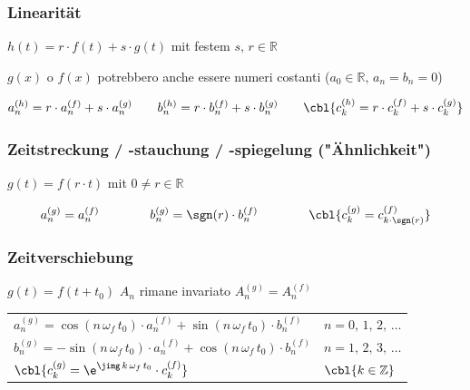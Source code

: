 \subsubsection{Linearität}
\begin{center}
\end{center}

$h(t) = r \cdot f(t) + s \cdot g(t)$ mit festem $s, \, r \in \mathbb{R}$

$g(x)$ o $f(x)$ potrebbero anche essere numeri costanti ($a_0 \in \mathbb{R}, \, a_n = b_n = 0$)

$$ a_n^{(h)} = r \cdot a_n^{(f)} + s \cdot a_n^{(g)} \qquad b_n^{(h)} = r \cdot b_n^{(f)} + s \cdot b_n^{(g)} \qquad \cbl{c_k^{(h)} = r \cdot c_k^{(f)} + s \cdot c_k^{(g)}}$$

\subsubsection{Zeitstreckung / -stauchung / -spiegelung ("Ähnlichkeit")}

$g(t) = f(r \cdot t)$ mit $0 \neq r \in \mathbb{R}$ \qquad {}

\[ a_n^{(g)} = a_n^{(f)} \qquad \qquad b_n^{(g)} = \sgn(r) \cdot b_n^{(f)} 
\qquad \qquad \cbl{c_k^{(g)} = c_{k\cdot \sgn(r)}^{(f)}}\]

\subsubsection{Zeitverschiebung}
$g(t) = f(t + t_0)$ \qquad \qquad $A_n$ rimane invariato \textrightarrow $A_n^{(g)} = A_n^{(f)}$

\smallskip

\renewcommand{\arraystretch}{1.5}
\begin{tabular}{ll}
    $a_n^{(g)} = \cos(n \, \omega_f \, t_0) \cdot a_n^{(f)} + \sin(n \, \omega_f \, t_0) \cdot b_n^{(f)}$    &\qquad $n = 0, \, 1, \, 2, \, \ldots$ \\ 
    $b_n^{(g)} = -\sin(n \, \omega_f \, t_0) \cdot a_n^{(f)} + \cos(n \, \omega_f \, t_0) \cdot b_n^{(f)}$   &\qquad $n = 1, \, 2, \, 3, \, \ldots$ \\  
    $\cbl{c_k^{(g)} = \e^{\jimg \, k \, \omega_f \, t_0} \cdot c_k^{(f)}}$                                   &\qquad $\cbl{k \in \mathbb{Z}}$
\end{tabular}
\renewcommand{\arraystretch}{1}


